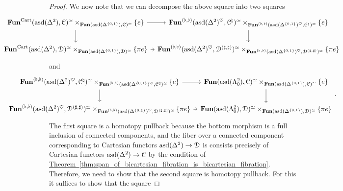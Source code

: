 \documentclass[main.tex]{subfiles}
\begin{document}
\begin{proof}
  We now note that we can decompose the above square into two squares
  \begin{equation*}
    \noindent\makebox[\textwidth]{%
      \begin{tikzcd}[ampersand replacement=\&, column sep=tiny]
        \Fun^{\Cart}(\asd(\Delta^{2}), \category{C})^{\simeq} \times_{\Fun(\asd(\Delta^{\{0, 1\}}), \category{C})^{\simeq}} \{e\}
        \arrow[r]
        \arrow[d]
        \& \Fun^{(\flat, \flat)}(\asd(\Delta^{2})^{\heartsuit}, \category{C}^{\natural})^{\simeq} \times_{\Fun^{(\flat, \flat)}(\asd(\Delta^{\{0, 1\}})^{\heartsuit}, \category{C}^{\natural})^{\simeq}} \{e\}
        \arrow[d]
        \\
        \Fun^{\Cart}(\asd(\Delta^{2}), \category{D})^{\simeq} \times_{\Fun(\asd(\Delta^{\{0, 1\}}), \category{D})^{\simeq}} \{\pi e\}
        \arrow[r]
        \& \Fun^{(\flat, \flat)}(\asd(\Delta^{2})^{\heartsuit}, \category{D}^{(\sharp, \sharp)})^{\simeq} \times_{\Fun^{(\flat, \flat)}(\asd(\Delta^{\{0, 1\}})^{\heartsuit}, \category{D}^{(\sharp, \sharp)})^{\simeq}} \{\pi e\}
      \end{tikzcd}
    }
  \end{equation*}
  and
  \begin{equation*}
    \noindent\makebox[\textwidth]{%
      \begin{tikzcd}[ampersand replacement=\&, column sep=tiny]
        \Fun^{(\flat, \flat)}(\asd(\Delta^{2})^{\heartsuit}, \category{C}^{\natural})^{\simeq} \times_{\Fun^{(\flat, \flat)}(\asd(\Delta^{\{0, 1\}})^{\heartsuit}, \category{C}^{\natural})^{\simeq}} \{e\}
        \arrow[r]
        \arrow[d]
        \& \Fun(\asd(\Lambda^{2}_{0}), \category{C})^{\simeq} \times_{\Fun(\asd(\Delta^{\{0, 1\}}), \category{C})^{\simeq}} \{e\}
        \arrow[d]
        \\
        \Fun^{(\flat, \flat)}(\asd(\Delta^{2})^{\heartsuit}, \category{D}^{(\sharp, \sharp)})^{\simeq} \times_{\Fun^{(\flat, \flat)}(\asd(\Delta^{\{0, 1\}})^{\heartsuit}, \category{D}^{(\sharp, \sharp)})^{\simeq}} \{\pi e\}
        \arrow[r]
        \& \Fun(\asd(\Lambda^{2}_{0}), \category{D})^{\simeq} \times_{\Fun(\asd(\Delta^{\{0, 1\}}), \category{D})^{\simeq}} \{\pi e\}
      \end{tikzcd}.
    }
  \end{equation*}
  The first square is a homotopy pullback because the bottom morphism is a full inclusion of connected components, and the fiber over a connected component corresponding to Cartesian functors $\mathrm{asd}(\Delta^{2}) \to \mathcal{D}$ is consists precisely of Cartesian functors $\mathrm{asd}(\Delta^{2}) \to \mathcal{C}$ by the condition of \hyperref[thm:span_of_bicartesian_fibration_is_bicartesian_fibration]{Theorem~\ref*{thm:span_of_bicartesian_fibration_is_bicartesian_fibration}}. Therefore, we need to show that the second square is homotopy pullback. For this it suffices to show that the square

\end{proof}
\end{document}
